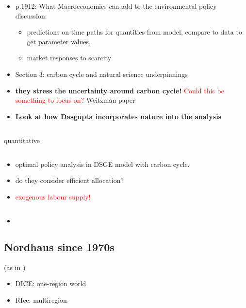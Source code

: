 \documentclass[12pt]{article}
\newcommand{\tr}[1]{\textcolor{red}{#1}}
\begin{document}
\begin{itemize}
\begin{itemize}
	 	\end{itemize}
\item p.1912: What Macroeconomics can add to the environmental policy discussion: 
 	\begin{itemize}
	\item predictions on time paths for quantities from model, compare to data to get parameter values, 
	\item market responses to scarcity
 	\end{itemize}
 \item Section 3: carbon cycle and natural science underpinnings
 \item \textbf{they stress the uncertainty around carbon cycle!} \tr{Could this be something to focus on?} Weitzman paper
 \item \textbf{Look at how Dasgupta incorporates nature into the analysis}
	 	
\end{itemize}
 \subsection{\cite{Acemoglu2016TransitionTechnology}} quantitative
 \subsection{\cite{Golosov2014OptimalEquilibrium}}
 
 \begin{itemize}
 	\item optimal policy analysis in DSGE model with carbon cycle.
 	\item do they consider efficient allocation?
 	\item \tr{exogenous labour supply!}
 \end{itemize}
\subsection{\cite{Bovenberg2002EnvironmentalRegulation}}
\begin{itemize}
	\item 
\end{itemize}
\subsection{Nordhaus since 1970s \citep{Nordhaus2018ProjectionsPolicies}} (as in \cite{Hassler2016EnvironmentalMacroeconomics})
\begin{itemize}
\item DICE: one-region world
\item RIce: multiregion
\end{itemize}
\end{document}
